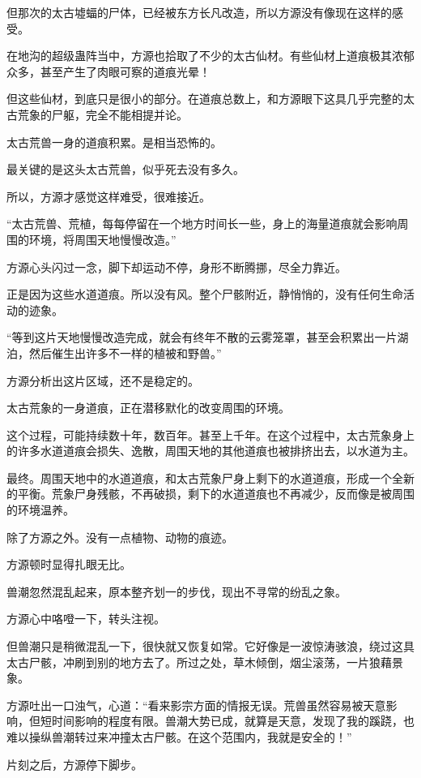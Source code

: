 \begin{this_body}
但那次的太古墟蝠的尸体，已经被东方长凡改造，所以方源没有像现在这样的感受。

在地沟的超级蛊阵当中，方源也拾取了不少的太古仙材。有些仙材上道痕极其浓郁众多，甚至产生了肉眼可察的道痕光晕！

但这些仙材，到底只是很小的部分。在道痕总数上，和方源眼下这具几乎完整的太古荒象的尸躯，完全不能相提并论。

太古荒兽一身的道痕积累。是相当恐怖的。

最关键的是这头太古荒兽，似乎死去没有多久。

所以，方源才感觉这样难受，很难接近。

“太古荒兽、荒植，每每停留在一个地方时间长一些，身上的海量道痕就会影响周围的环境，将周围天地慢慢改造。”

方源心头闪过一念，脚下却运动不停，身形不断腾挪，尽全力靠近。

正是因为这些水道道痕。所以没有风。整个尸骸附近，静悄悄的，没有任何生命活动的迹象。

“等到这片天地慢慢改造完成，就会有终年不散的云雾笼罩，甚至会积累出一片湖泊，然后催生出许多不一样的植被和野兽。”

方源分析出这片区域，还不是稳定的。

太古荒象的一身道痕，正在潜移默化的改变周围的环境。

这个过程，可能持续数十年，数百年。甚至上千年。在这个过程中，太古荒象身上的许多水道道痕会损失、逸散，周围天地的其他道痕也被排挤出去，以水道为主。

最终。周围天地中的水道道痕，和太古荒象尸身上剩下的水道道痕，形成一个全新的平衡。荒象尸身残骸，不再破损，剩下的水道道痕也不再减少，反而像是被周围的环境温养。

除了方源之外。没有一点植物、动物的痕迹。

方源顿时显得扎眼无比。

兽潮忽然混乱起来，原本整齐划一的步伐，现出不寻常的纷乱之象。

方源心中咯噔一下，转头注视。

但兽潮只是稍微混乱一下，很快就又恢复如常。它好像是一波惊涛骇浪，绕过这具太古尸骸，冲刷到别的地方去了。所过之处，草木倾倒，烟尘滚荡，一片狼藉景象。

方源吐出一口浊气，心道：“看来影宗方面的情报无误。荒兽虽然容易被天意影响，但短时间影响的程度有限。兽潮大势已成，就算是天意，发现了我的蹊跷，也难以操纵兽潮转过来冲撞太古尸骸。在这个范围内，我就是安全的！”

片刻之后，方源停下脚步。


\end{this_body}
